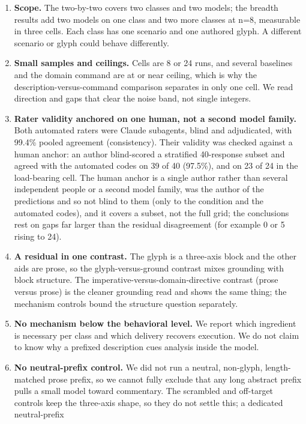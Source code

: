 \documentclass[11pt,a4paper]{article}
\begin{document}
\begin{enumerate}
  \item \textbf{Scope.} The two-by-two covers two classes and two models; the breadth
    results add two models on one class and two more classes at n=8, measurable in
    three cells. Each class has one scenario and one authored glyph. A different
    scenario or glyph could behave differently.
  \item \textbf{Small samples and ceilings.} Cells are 8 or 24 runs, and several
    baselines and the domain command are at or near ceiling, which is why the
    description-versus-command comparison separates in only one cell. We read
    direction and gaps that clear the noise band, not single integers.
  \item \textbf{Rater validity anchored on one human, not a second model family.} Both
    automated raters were Claude subagents, blind and adjudicated, with 99.4\% pooled
    agreement (consistency). Their validity was checked against a human anchor: an
    author blind-scored a stratified 40-response subset and agreed with the automated
    codes on 39 of 40 (97.5\%), and on 23 of 24 in the load-bearing cell. The human
    anchor is a single author rather than several independent people or a second model
    family, was the author of the predictions and so not blind to them (only to the
    condition and the automated codes), and it covers a subset, not the full grid; the
    conclusions rest on gaps far larger than the residual disagreement (for example 0 or
    5 rising to 24).
  \item \textbf{A residual in one contrast.} The glyph is a three-axis block and the
    other aids are prose, so the glyph-versus-ground contrast mixes grounding with
    block structure. The imperative-versus-domain-directive contrast (prose versus
    prose) is the cleaner grounding read and shows the same thing; the mechanism
    controls bound the structure question separately.
  \item \textbf{No mechanism below the behavioral level.} We report which ingredient
    is necessary per class and which delivery recovers execution. We do not claim to
    know why a prefixed description cues analysis inside the model.
  \item \textbf{No neutral-prefix control.} We did not run a neutral, non-glyph,
    length-matched prose prefix, so we cannot fully exclude that any long abstract
    prefix pulls a small model toward commentary. The scrambled and off-target controls
    keep the three-axis shape, so they do not settle this; a dedicated neutral-prefix

\end{enumerate}
\end{document}
